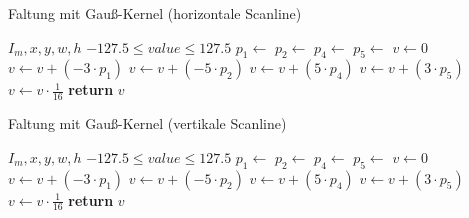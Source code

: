 \begin{algorithm}[ht]
\caption{Faltung mit Gauß-Kernel (horizontale Scanline)}
\label{alg:derivativeofgauss-horizontal}
\begin{algorithmic}[1]
	\Require $I_m,x,y,w,h$
	\Ensure $-127.5 \leq value \leq 127.5$
	\State $p_1 \gets$ 
	\label{alg:derivativeofgauss-horizontal-readstart}
	\State $p_2 \gets$ 
	\State $p_4 \gets$ 
	\State $p_5 \gets$ 
	\label{alg:derivativeofgauss-horizontal-readend}
	\State $v \gets 0$
	\State $v \gets v + \left( -3 \cdot p_1 \right)$
	\State $v \gets v + \left( -5 \cdot p_2 \right)$
	\State $v \gets v + \left( 5 \cdot p_4 \right)$
	\State $v \gets v + \left( 3 \cdot p_5 \right)$
	\State $v \gets v \cdot \frac{1}{16}$
	\State \textbf{return} $v$
\end{algorithmic}
\end{algorithm}

\begin{algorithm}[ht]
\caption{Faltung mit Gauß-Kernel (vertikale Scanline)}
\label{alg:derivativeofgauss-vertical}
\begin{algorithmic}[1]
	\Require $I_m,x,y,w,h$
	\Ensure $-127.5 \leq value \leq 127.5$
	\State $p_1 \gets$ 
	\State $p_2 \gets$ 
	\State $p_4 \gets$ 
	\State $p_5 \gets$ 
	\State $v \gets 0$
	\State $v \gets v + \left( -3 \cdot p_1 \right)$
	\State $v \gets v + \left( -5 \cdot p_2 \right)$
	\State $v \gets v + \left( 5 \cdot p_4 \right)$
	\State $v \gets v + \left( 3 \cdot p_5 \right)$
	\State $v \gets v \cdot \frac{1}{16}$
	\State \textbf{return} $v$
\end{algorithmic}
\end{algorithm}
